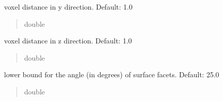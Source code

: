 \documentclass[letterpaper,10pt,english]{sphinxmanual}
\begin{document}
\begin{fulllineitems}
\begin{fulllineitems}
\begin{quote}
\begin{description}
\end{description}\end{quote}

\end{fulllineitems}


\begin{fulllineitems}
\label{\detokenize{_autosummary/nirfasterff.utils.MeshingParams:nirfasterff.utils.MeshingParams.yPixelSpacing}}
\pysigstartsignatures
\pysigline
{}
\pysigstopsignatures
\sphinxAtStartPar
voxel distance in y direction. Default: 1.0
\begin{quote}\begin{description}
\sphinxAtStartPar
double

\end{description}\end{quote}

\end{fulllineitems}


\begin{fulllineitems}
\label{\detokenize{_autosummary/nirfasterff.utils.MeshingParams:nirfasterff.utils.MeshingParams.SliceThickness}}
\pysigstartsignatures
\pysigline
{}
\pysigstopsignatures
\sphinxAtStartPar
voxel distance in z direction. Default: 1.0
\begin{quote}\begin{description}
\sphinxAtStartPar
double

\end{description}\end{quote}

\end{fulllineitems}


\begin{fulllineitems}
\label{\detokenize{_autosummary/nirfasterff.utils.MeshingParams:nirfasterff.utils.MeshingParams.facet_angle}}
\pysigstartsignatures
\pysigline
{}
\pysigstopsignatures
\sphinxAtStartPar
lower bound for the angle (in degrees) of surface facets. Default: 25.0
\begin{quote}\begin{description}
\sphinxAtStartPar
double


\end{description}
\end{quote}
\end{fulllineitems}
\end{fulllineitems}
\end{document}
